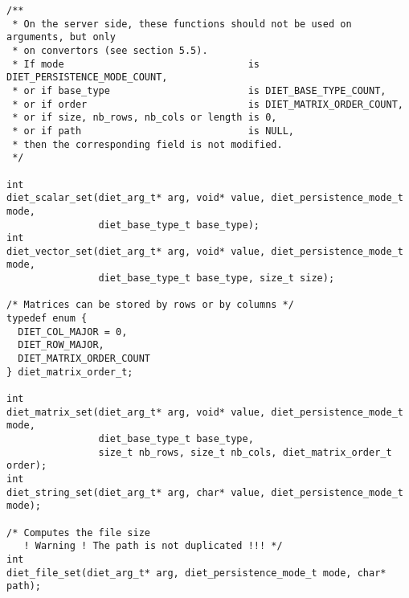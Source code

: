 
\label{sec:setfun}
{\footnotesize
\begin{verbatim}
/**
 * On the server side, these functions should not be used on arguments, but only
 * on convertors (see section 5.5).
 * If mode                                is DIET_PERSISTENCE_MODE_COUNT, 
 * or if base_type                        is DIET_BASE_TYPE_COUNT,
 * or if order                            is DIET_MATRIX_ORDER_COUNT,
 * or if size, nb_rows, nb_cols or length is 0,
 * or if path                             is NULL,
 * then the corresponding field is not modified.
 */

int
diet_scalar_set(diet_arg_t* arg, void* value, diet_persistence_mode_t mode,
                diet_base_type_t base_type);
int
diet_vector_set(diet_arg_t* arg, void* value, diet_persistence_mode_t mode,
                diet_base_type_t base_type, size_t size);

/* Matrices can be stored by rows or by columns */
typedef enum {
  DIET_COL_MAJOR = 0,
  DIET_ROW_MAJOR,
  DIET_MATRIX_ORDER_COUNT
} diet_matrix_order_t;

int
diet_matrix_set(diet_arg_t* arg, void* value, diet_persistence_mode_t mode,
                diet_base_type_t base_type,
                size_t nb_rows, size_t nb_cols, diet_matrix_order_t order);
int
diet_string_set(diet_arg_t* arg, char* value, diet_persistence_mode_t mode);

/* Computes the file size
   ! Warning ! The path is not duplicated !!! */
int
diet_file_set(diet_arg_t* arg, diet_persistence_mode_t mode, char* path);
\end{verbatim}
}


